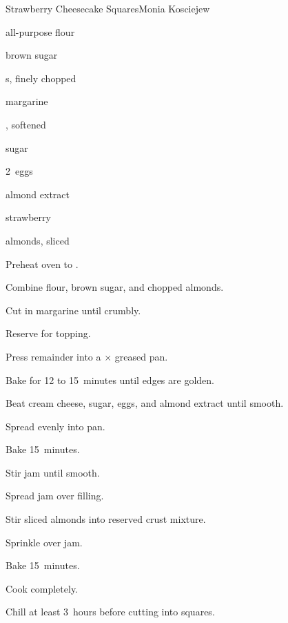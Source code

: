 \begin{recipe}{Strawberry Cheesecake Squares}{Monia Kosciejew}{}

\begin{ingredients}
\item {} all-purpose flour
\item \C{\threequarter} brown sugar
\item \C{\threequarter} s, finely chopped
\item \C{\threequarter} margarine
\item {} , softened
\item \C{\twothird} sugar
\item 2~eggs
\item \tp{\half} almond extract
\item {} strawberry 
\item \C{\threequarter} almonds, sliced
\end{ingredients}

\begin{directions}
\item Preheat oven to .
\item Combine flour, brown sugar, and chopped almonds.
\item Cut in margarine until crumbly.
\item Reserve \C{\threequarter} for topping.
\item Press remainder into a $\times$ greased pan.
\item Bake for 12 to 15~minutes until edges are golden.
\item Beat cream cheese, sugar, eggs, and almond extract until smooth.
\item Spread evenly into pan.
\item Bake 15~minutes.
\item Stir jam until smooth.
\item Spread jam over filling.
\item Stir sliced almonds into reserved crust mixture.
\item Sprinkle over jam.
\item Bake 15~minutes.
\item Cook completely.
\item Chill at least 3~hours before cutting into squares.
\end{directions}

\end{recipe}
